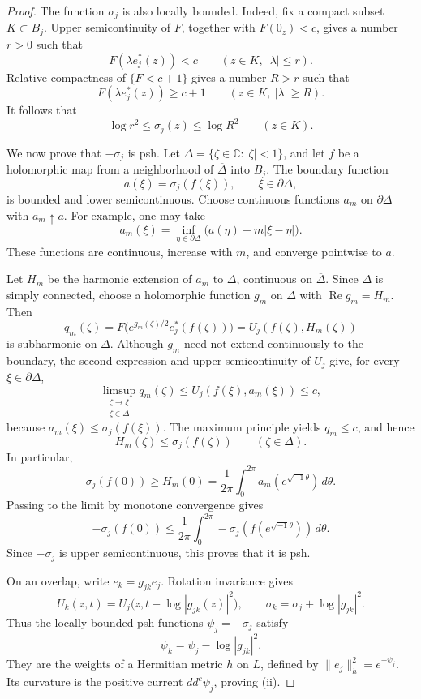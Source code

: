 \documentclass[11pt]{amsart}
\theoremstyle{definition}
\theoremstyle{remark}
\numberwithin{equation}{section}
\newcommand{\C}{\mathbb C}
\newcommand{\ddc}{dd^c}
\begin{document}
\begin{proof}
The function $\sigma_j$ is also locally bounded. Indeed,
fix a compact subset $K\subset B_j$. Upper semicontinuity
of $F$, together with $F(0_z)<c$, gives a number $r>0$ such
that
\[
 F(\lambda e_j^*(z))<c
 \qquad(z\in K,\ |\lambda|\le r).
\]
Relative compactness of $\{F<c+1\}$ gives a number $R>r$
such that
\[
 F(\lambda e_j^*(z))\ge c+1
 \qquad(z\in K,\ |\lambda|\ge R).
\]
It follows that
\[
 \log r^2\le\sigma_j(z)\le\log R^2
 \qquad(z\in K).
\]

We now prove that $-\sigma_j$ is psh. Let
$\Delta=\{\zeta\in\C:|\zeta|<1\}$, and let $f$ be a
holomorphic map from a neighborhood of $\overline\Delta$
into $B_j$. The boundary function
\[
 a(\xi)=\sigma_j(f(\xi)),\qquad \xi\in\partial\Delta,
\]
is bounded and lower semicontinuous. Choose continuous
functions $a_m$ on $\partial\Delta$ with $a_m\uparrow a$.
For example, one may take
\[
 a_m(\xi)=\inf_{\eta\in\partial\Delta}
          \bigl(a(\eta)+m|\xi-\eta|\bigr).
\]
These functions are continuous, increase with $m$, and
converge pointwise to $a$.

Let $H_m$ be the harmonic extension of $a_m$ to $\Delta$,
continuous on $\overline\Delta$. Since $\Delta$ is simply
connected, choose a holomorphic function $g_m$ on $\Delta$
with $\operatorname{Re}g_m=H_m$. Then
\[
 q_m(\zeta)
 =F\bigl(e^{g_m(\zeta)/2}e_j^*(f(\zeta))\bigr)
 =U_j(f(\zeta),H_m(\zeta))
\]
is subharmonic on $\Delta$. Although $g_m$ need not extend
continuously to the boundary, the second expression and
upper semicontinuity of $U_j$ give, for every
$\xi\in\partial\Delta$,
\[
 \limsup_{\substack{\zeta\to\xi\\\zeta\in\Delta}}q_m(\zeta)
 \le U_j(f(\xi),a_m(\xi))\le c,
\]
because $a_m(\xi)\le\sigma_j(f(\xi))$.
The maximum principle yields $q_m\le c$, and hence
\[
 H_m(\zeta)\le\sigma_j(f(\zeta))
 \qquad(\zeta\in\Delta).
\]
In particular,
\[
 \sigma_j(f(0))\ge H_m(0)
 =\frac1{2\pi}\int_0^{2\pi}
       a_m(e^{\sqrt{-1}\theta})\,d\theta.
\]
Passing to the limit by monotone convergence gives
\[
 -\sigma_j(f(0))
 \le\frac1{2\pi}\int_0^{2\pi}
       -\sigma_j(f(e^{\sqrt{-1}\theta}))\,d\theta.
\]
Since $-\sigma_j$ is upper semicontinuous, this proves that
it is psh.

On an overlap, write $e_k=g_{jk}e_j$. Rotation invariance
gives
\[
 U_k(z,t)=U_j\bigl(z,t-\log|g_{jk}(z)|^2\bigr),
 \qquad \sigma_k=\sigma_j+\log|g_{jk}|^2.
\]
Thus the locally bounded psh functions $\psi_j=-\sigma_j$
satisfy
\[
 \psi_k=\psi_j-\log|g_{jk}|^2.
\]
They are the weights of a Hermitian metric $h$ on $L$,
defined by $\|e_j\|_h^2=e^{-\psi_j}$. Its curvature is the
positive current $\ddc\psi_j$, proving \textup{(ii)}.


\end{proof}
\end{document}

